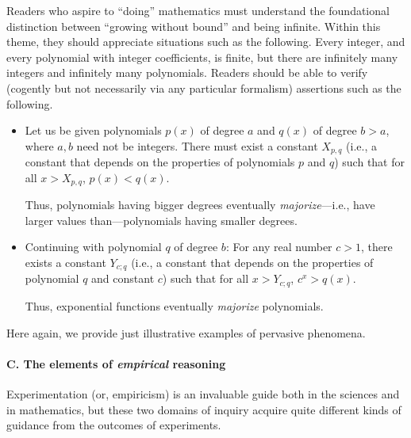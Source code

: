 Readers who aspire to ``doing'' mathematics must understand the
foundational distinction between ``growing without bound'' and being
infinite.  Within this theme, they should appreciate situations such
as the following.  Every integer, and every polynomial with integer
coefficients, is finite, but there are infinitely many integers and
infinitely many polynomials.  Readers should be able to verify
(cogently but not necessarily via any particular formalism) assertions
such as the following.
\begin{itemize}
\item
Let us be given polynomials $p(x)$ of degree $a$ and $q(x)$ of degree
$b > a$, where $a, b$ need not be integers.  There must exist a
constant $X_{p,q}$ (i.e., a constant that depends on the properties of
polynomials $p$ and $q$) such that for all $x > X_{p,q}$, $p(x) <
q(x)$.

Thus, polynomials having bigger degrees eventually {\em
  majorize}---i.e., have larger values than---polynomials having
smaller degrees.

\item
Continuing with polynomial $q$ of degree $b$: For any real number $c >
1$, there exists a constant $Y_{c;q}$ (i.e., a constant that depends
on the properties of polynomial $q$ and constant $c$) such that for
all $x > Y_{c;q}$, $c^x > q(x)$.

Thus, exponential functions eventually {\em majorize} polynomials.
\end{itemize}
Here again, we provide just illustrative examples of pervasive
phenomena.

\medskip

\paragraph{\small\sf C. The elements of {\em empirical} reasoning}

Experimentation (or, empiricism) is an invaluable guide both in the
sciences and in mathematics, but these two domains of inquiry acquire
quite different kinds of guidance from the outcomes of experiments.

